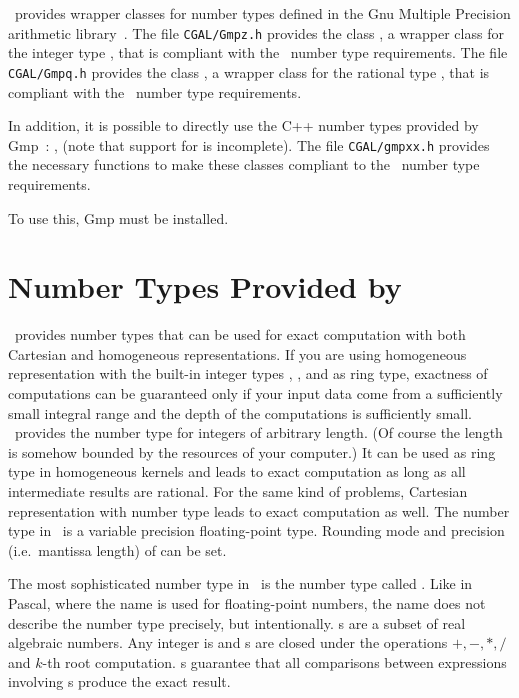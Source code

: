 \cgal\ provides wrapper classes for number types defined in the
{\sc Gnu} Multiple Precision arithmetic library~\cite{g-ggmpa-}.
The file {\tt  CGAL/Gmpz.h} provides the class ,
a wrapper class for the integer type , that is compliant with the
\cgal\ number type requirements. The file {\tt  CGAL/Gmpq.h} provides the class ,
a wrapper class for the rational type , that is compliant
with the
\cgal\ number type requirements.

In addition, it is possible to directly use the C++ number types provided by
{\sc Gmp}~: ,  (note that support for
 is incomplete).  The file {\tt CGAL/gmpxx.h} provides the
necessary functions to make these classes compliant to the \cgal\ number type
requirements.

To use this, {\sc Gmp} must be installed.


\section{Number Types Provided by \leda}
\label{leda-nt}

\leda\ provides number types that can be used for exact computation 
with both Cartesian and homogeneous representations.  If you are using
homogeneous representation with the built-in integer types
, , and  as ring type, exactness of
computations can be guaranteed only if your input data come from a
sufficiently small integral range and the depth of the computations is
sufficiently small.  \leda\ provides the number type  for
integers of arbitrary length. (Of course the length is
somehow bounded by the resources of your computer.)  It can be used as
ring type in homogeneous kernels and leads to exact
computation as long as all intermediate results are rational.  For the
same kind of problems, Cartesian representation with number type
 leads to exact computation as well.
The number type  in \leda\ is a variable precision
floating-point type. Rounding mode and precision (i.e.\ mantissa length) of
 can be set. 

The most sophisticated number type in \leda\ is the number type called
. Like in Pascal, where the name  is used for
floating-point numbers, the name  does not describe the
number type precisely, but intentionally.  
s are a subset of real algebraic
numbers.  Any integer is  and s are closed under
the operations $+,-,*,/$ and $k$-th root computation. 
s guarantee that
all comparisons between expressions involving s produce the
exact result.


